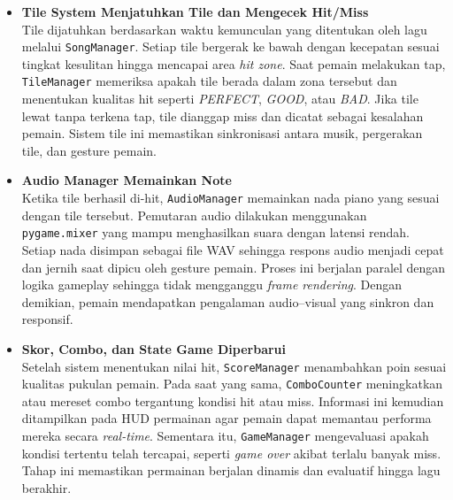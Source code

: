 \documentclass[12pt,a4paper]{article}
\begin{document}
\begin{itemize}
\item \textbf{Tile System Menjatuhkan Tile dan Mengecek Hit/Miss} \\
Tile dijatuhkan berdasarkan waktu kemunculan yang ditentukan oleh lagu melalui \texttt{SongManager}. Setiap tile bergerak ke bawah dengan kecepatan sesuai tingkat kesulitan hingga mencapai area \textit{hit zone}. Saat pemain melakukan tap, \texttt{TileManager} memeriksa apakah tile berada dalam zona tersebut dan menentukan kualitas hit seperti \textit{PERFECT}, \textit{GOOD}, atau \textit{BAD}. Jika tile lewat tanpa terkena tap, tile dianggap miss dan dicatat sebagai kesalahan pemain. Sistem tile ini memastikan sinkronisasi antara musik, pergerakan tile, dan gesture pemain.

\item \textbf{Audio Manager Memainkan Note} \\
Ketika tile berhasil di-hit, \texttt{AudioManager} memainkan nada piano yang sesuai dengan tile tersebut. Pemutaran audio dilakukan menggunakan \texttt{pygame.mixer} yang mampu menghasilkan suara dengan latensi rendah. Setiap nada disimpan sebagai file WAV sehingga respons audio menjadi cepat dan jernih saat dipicu oleh gesture pemain. Proses ini berjalan paralel dengan logika gameplay sehingga tidak mengganggu \textit{frame rendering}. Dengan demikian, pemain mendapatkan pengalaman audio–visual yang sinkron dan responsif.

\item \textbf{Skor, Combo, dan State Game Diperbarui} \\
Setelah sistem menentukan nilai hit, \texttt{ScoreManager} menambahkan poin sesuai kualitas pukulan pemain. Pada saat yang sama, \texttt{ComboCounter} meningkatkan atau mereset combo tergantung kondisi hit atau miss. Informasi ini kemudian ditampilkan pada HUD permainan agar pemain dapat memantau performa mereka secara \textit{real-time}. Sementara itu, \texttt{GameManager} mengevaluasi apakah kondisi tertentu telah tercapai, seperti \textit{game over} akibat terlalu banyak miss. Tahap ini memastikan permainan berjalan dinamis dan evaluatif hingga lagu berakhir.

\end{itemize}

\newpage
\printbibliography[title={Daftar Pustaka}]
\end{document}
